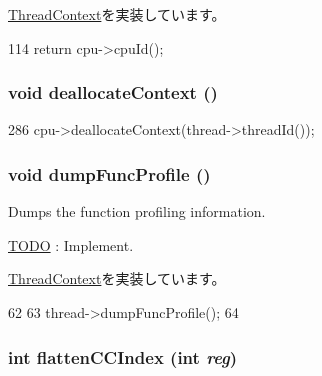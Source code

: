 \hyperlink{classThreadContext_a7272bc1f752a9f60ab0358a09cc96f97}{ThreadContext}を実装しています。


\begin{DoxyCode}
114 { return cpu->cpuId(); }
\end{DoxyCode}
\hypertarget{classInOrderThreadContext_a84a8d5596f32e480e2d6d8199800bc91}{
\subsubsection[{deallocateContext}]{\setlength{\rightskip}{0pt plus 5cm}void deallocateContext ()}}
\label{classInOrderThreadContext_a84a8d5596f32e480e2d6d8199800bc91}



\begin{DoxyCode}
286     { cpu->deallocateContext(thread->threadId()); }
\end{DoxyCode}
\hypertarget{classInOrderThreadContext_a13fa12d1779a94a1e0b968946a1367c7}{
\subsubsection[{dumpFuncProfile}]{\setlength{\rightskip}{0pt plus 5cm}void dumpFuncProfile ()}}
\label{classInOrderThreadContext_a13fa12d1779a94a1e0b968946a1367c7}
Dumps the function profiling information. \begin{Desc}
\item[\hyperlink{todo__todo000025}{TODO}]: Implement. \end{Desc}


\hyperlink{classThreadContext_ae3f0b63a85470c17e675083487febead}{ThreadContext}を実装しています。


\begin{DoxyCode}
62 {
63     thread->dumpFuncProfile();
64 }
\end{DoxyCode}
\hypertarget{classInOrderThreadContext_ac33d74353e36a595ec48962cd0446320}{
\subsubsection[{flattenCCIndex}]{\setlength{\rightskip}{0pt plus 5cm}int flattenCCIndex (int {\em reg})}}
\label{classInOrderThreadContext_ac33d74353e36a595ec48962cd0446320}


